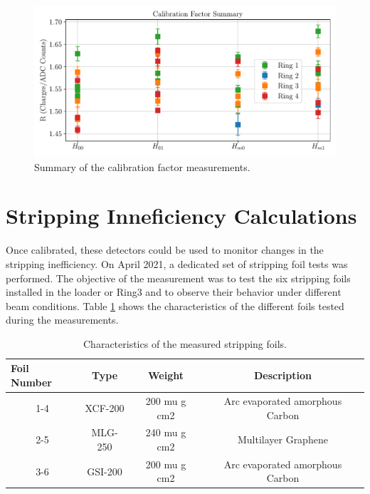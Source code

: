 \begin{figure}[h]
    \centering
    \includegraphics[width=0.9\columnwidth]{Figure_MeasurementSummary/CalSummary.pdf}
    \caption{Summary of the calibration factor measurements.}
    \label{fig:SummaryR}
\end{figure}

\section{Stripping Inneficiency Calculations}

Once calibrated, these detectors could be used to monitor changes in the stripping inefficiency. On April 2021, a dedicated set of stripping foil tests was performed. The objective of the measurement was to test the six stripping foils installed in the loader or Ring3 and to observe their behavior under different beam conditions. Table \ref{tab:SfType} shows the characteristics of the different foils tested during the measurements. 

\begin{table}[h]
    \begin{tabular}{cccc}
    \hline
    \multicolumn{1}{l}{\textbf{Foil Number}} & \textbf{Type} & \textbf{Weight} & \textbf{Description}            \\ \hline
    1-4                                      & XCF-200       & 200 mu g cm2    & Arc evaporated amorphous Carbon \\
    2-5                                      & MLG-250       & 240 mu g cm2    & Multilayer Graphene             \\
    3-6                                      & GSI-200       & 200 mu g cm2    & Arc evaporated amorphous Carbon \\ \hline
    \end{tabular}
    \caption{Characteristics of the measured stripping foils. }
    \label{tab:SfType}
\end{table}


